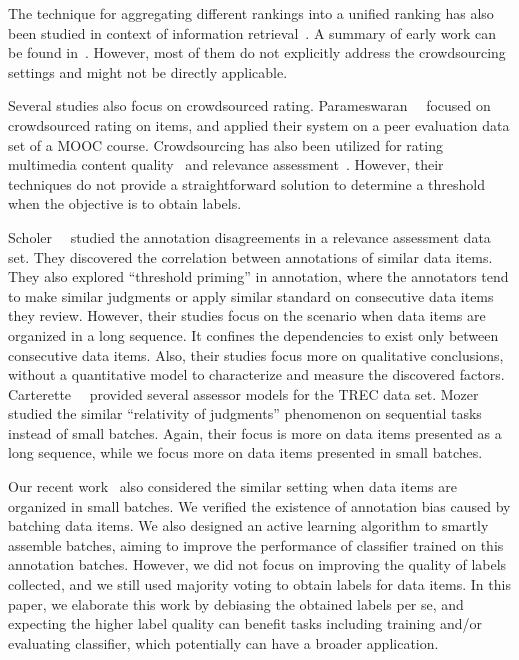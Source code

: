 The technique for aggregating different rankings into a unified ranking has also been studied 
in context of information retrieval~\cite{klementiev:icml2008,liu:www2007,qin:nips2010}.  
A summary of early work can be found in~\cite{dwork:www2001}.
However, most of them do not explicitly address the crowdsourcing settings and might not be directly applicable. 


Several studies also focus on crowdsourced rating.  
Parameswaran~\etal~\cite{parameswaran:vldb2014} focused on crowdsourced rating on items, 
and applied their system on a peer evaluation data set of a MOOC course.  
Crowdsourcing has also been utilized for rating multimedia content quality~\cite{chen:mm2009} and relevance assessment~\cite{alonso:2008}.  
However, their techniques do not provide a straightforward solution to determine a threshold 
when the objective is to obtain labels.  



Scholer~\etal~\cite{scholer:sigir2013,scholer:sigir2011} studied the annotation disagreements in 
a relevance assessment data set.  
They discovered the correlation between annotations of similar data items.  %
They also explored ``threshold priming'' in annotation, 
where the annotators tend to make similar judgments or apply similar standard on consecutive data items they review. 
However, their studies focus on the scenario when data items are organized in a long sequence.  
It confines the dependencies to exist only between consecutive data items.  
Also, their studies focus more on qualitative conclusions, without a quantitative model to characterize and measure the discovered factors.  
Carterette~\etal~\cite{carterette:effect2010} provided several assessor models for the TREC data set.  
Mozer~\etal~\cite{mozer:nips2010} studied the similar ``relativity of
judgments'' phenomenon on sequential tasks instead of small batches.  
Again, their focus is more on data items presented as a long sequence, while we focus more on data items presented in small batches.  

Our recent work~\cite{zhuang:wsdm2015} also considered the similar setting when data items are organized in small batches.  
We verified the existence of annotation bias caused by batching data items.  
We also designed an active learning algorithm to smartly assemble batches, 
aiming to improve the performance of classifier trained on this annotation batches.  
However, we did not focus on improving the quality of labels collected, 
and we still used majority voting to obtain labels for data items.  
In this paper, we elaborate this work by debiasing the obtained labels per se, 
and expecting the higher label quality can benefit tasks including training and/or evaluating classifier, 
which potentially can have a broader application.  



